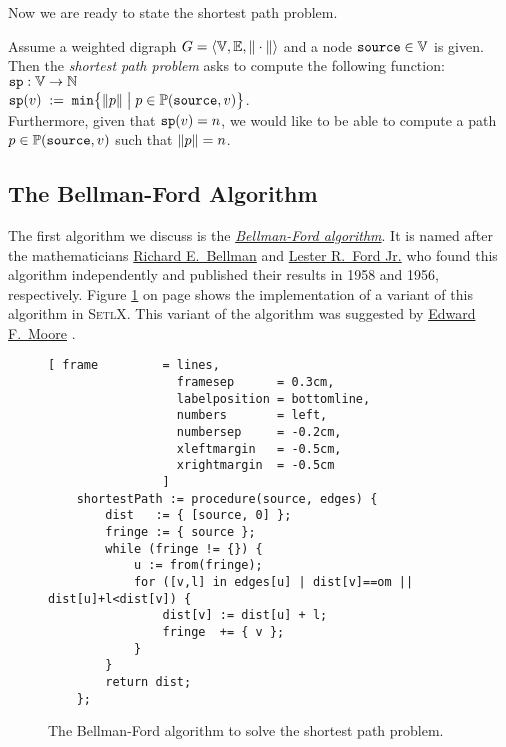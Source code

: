 \noindent
Now we are ready to state the shortest path problem.

\begin{Definition} \lb
  Assume a weighted digraph  
  $G = \langle {\mathbb V}, {\mathbb E}, \|\cdot\| \rangle$ 
  and a node $\mbox{\tt source} \in {\mathbb V}$ is given.  Then the \emph{shortest path problem} asks to compute
  the following function:
  \\[0.2cm]
  \hspace*{1.3cm} $\mbox{\tt sp}: {\mathbb V} \rightarrow {\mathbb N}$ \\[0.1cm]
  \hspace*{1.3cm} $\mbox{\tt sp}(v) \;:=\; \mathtt{min}\bigl\{ \|p\| \bigm| p \in {\mathbb P}(\mbox{\tt source},v) \bigr\}$.
  \\[0.2cm]
  Furthermore, given that $\mbox{\tt sp}(v) = n$, we would like to be able to compute a path 
  $p \in {\mathbb P}(\mbox{\tt source},v)$ such that $\|p\| = n$.
  \eox
\end{Definition}

\subsection{The Bellman-Ford Algorithm}
The first algorithm we discuss is the
\href{https://en.wikipedia.org/wiki/Bellman-Ford_algorithm}{\emph{Bellman-Ford algorithm}}.
It is named after the mathematicians 
\href{https://en.wikipedia.org/wiki/Richard_E._Bellman}{Richard E.~Bellman} \cite{bellman:58} and 
\href{https://en.wikipedia.org/wiki/L._R._Ford_Jr.}{Lester R.~Ford Jr.} \cite{ford:56} who found this algorithm
independently and published their results in 1958 and 1956, respectively.  Figure
\ref{fig:moore.stlx} on page \pageref{fig:moore.stlx} shows the implementation of a variant of this 
algorithm in \textsc{SetlX}.  This variant of the algorithm was suggested by 
\href{https://en.wikipedia.org/wiki/Edward_F._Moore}{Edward F.~Moore} \cite{moore:59}.
\pagebreak

\begin{figure}[!ht]
  \centering
\begin{Verbatim}[ frame         = lines, 
                  framesep      = 0.3cm, 
                  labelposition = bottomline,
                  numbers       = left,
                  numbersep     = -0.2cm,
                  xleftmargin   = -0.5cm,
                  xrightmargin  = -0.5cm
                ]
    shortestPath := procedure(source, edges) {
        dist   := { [source, 0] };
        fringe := { source };
        while (fringe != {}) {
            u := from(fringe);
            for ([v,l] in edges[u] | dist[v]==om || dist[u]+l<dist[v]) {
                dist[v] := dist[u] + l;
                fringe  += { v };
            }
        }
        return dist;
    };
\end{Verbatim}
\vspace*{-0.3cm}
  \caption{The Bellman-Ford algorithm to solve the shortest path problem.}
  \label{fig:moore.stlx}
\end{figure} 

